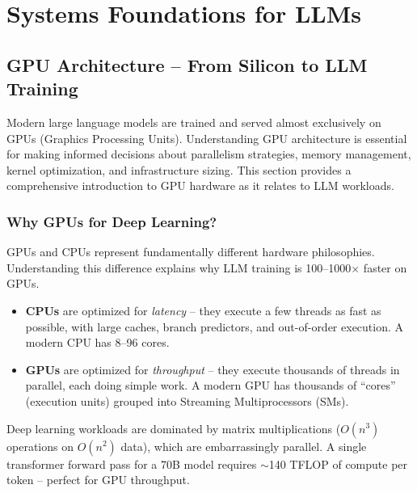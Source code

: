 \chapter{Systems Foundations for LLMs}
\label{systems-foundations-for-llms}

\section{GPU Architecture -- From Silicon to LLM Training}
\label{gpu-architecture-from-silicon-to-llm-training}

Modern large language models are trained and served almost exclusively on GPUs (Graphics Processing Units). Understanding GPU architecture is essential for making informed decisions about parallelism strategies, memory management, kernel optimization, and infrastructure sizing. This section provides a comprehensive introduction to GPU hardware as it relates to LLM workloads.

\subsection{Why GPUs for Deep Learning?}
\label{why-gpus-for-deep-learning}

GPUs and CPUs represent fundamentally different hardware philosophies. Understanding this difference explains why LLM training is 100--1000$\times$ faster on GPUs.

\begin{intuitionbox}
\begin{itemize}
  \item \textbf{CPUs} are optimized for \emph{latency} -- they execute a few threads as fast as possible, with large caches, branch predictors, and out-of-order execution. A modern CPU has 8--96 cores.
  \item \textbf{GPUs} are optimized for \emph{throughput} -- they execute thousands of threads in parallel, each doing simple work. A modern GPU has thousands of ``cores'' (execution units) grouped into Streaming Multiprocessors (SMs).
\end{itemize}

Deep learning workloads are dominated by matrix multiplications ($O(n^3)$ operations on $O(n^2)$ data), which are embarrassingly parallel. A single transformer forward pass for a 70B model requires $\sim$140 TFLOP of compute per token -- perfect for GPU throughput.
\end{intuitionbox}

